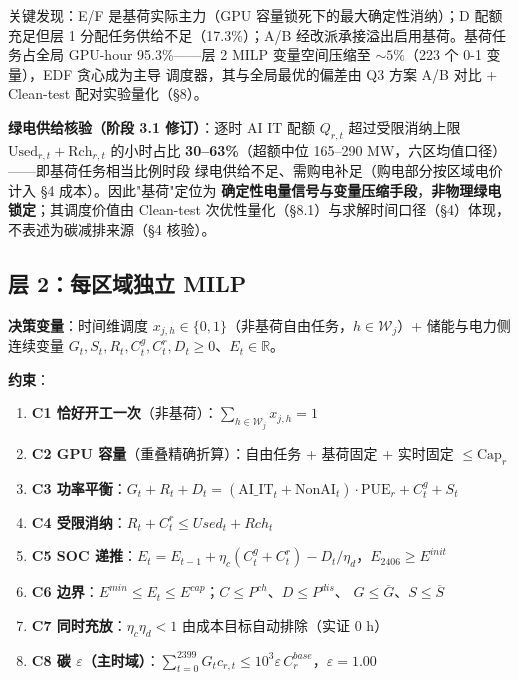\documentclass{internal-report}
\begin{document}
关键发现：E/F 是基荷实际主力（GPU 容量锁死下的最大确定性消纳）；D 配额充足但层 1
分配任务供给不足（17.3\%）；A/B 经改派承接溢出启用基荷。基荷任务占全局 GPU-hour
95.3\%——层 2 MILP 变量空间压缩至 $\sim 5\%$（223 个 0-1 变量），EDF 贪心成为主导
调度器，其与全局最优的偏差由 Q3 方案 A/B 对比 + Clean-test 配对实验量化（§8）。

\textbf{绿电供给核验（阶段 3.1 修订）}：逐时 AI IT 配额
$Q_{r,t}$ 超过受限消纳上限 $\text{Used}_{r,t}+\text{Rch}_{r,t}$ 的小时占比
\textbf{30--63\%}（超额中位 165--290 MW，六区均值口径）——即基荷任务相当比例时段
绿电供给不足、需购电补足（购电部分按区域电价计入 §4 成本）。因此"基荷"定位为
\textbf{确定性电量信号与变量压缩手段}，\textbf{非物理绿电锁定}；其调度价值由
Clean-test 次优性量化（§8.1）与求解时间口径（§4）体现，不表述为碳减排来源（§4 核验）。

\subsection{层 2：每区域独立 MILP}

\textbf{决策变量}：时间维调度 $x_{j,h}\in\{0,1\}$（非基荷自由任务，$h\in\mathcal{W}_j$）+
储能与电力侧连续变量 $G_t,S_t,R_t,C^g_t,C^r_t,D_t\ge0$、$E_t\in\mathbb{R}$。

\textbf{约束}：
\begin{enumerate}
  \item \textbf{C1 恰好开工一次}（非基荷）：$\sum_{h\in\mathcal{W}_j} x_{j,h}=1$
  \item \textbf{C2 GPU 容量}（重叠精确折算）：自由任务 + 基荷固定 + 实时固定 $\le \text{Cap}_r$
  \item \textbf{C3 功率平衡}：$G_t+R_t+D_t = (\text{AI\_IT}_t+\text{NonAI}_t)\cdot\text{PUE}_r + C^g_t + S_t$
  \item \textbf{C4 受限消纳}：$R_t + C^r_t \le Used_t + Rch_t$
  \item \textbf{C5 SOC 递推}：$E_t = E_{t-1} + \eta_c(C^g_t+C^r_t) - D_t/\eta_d$，$E_{2406}\ge E^{init}$
  \item \textbf{C6 边界}：$E^{min}\le E_t\le E^{cap}$；$C\le P^{ch}$、$D\le P^{dis}$、
        $G\le \overline{G}$、$S\le \overline{S}$
  \item \textbf{C7 同时充放}：$\eta_c\eta_d<1$ 由成本目标自动排除（实证 0 h）
  \item \textbf{C8 碳 $\varepsilon$（主时域）}：$\sum_{t=0}^{2399} G_t c_{r,t}
        \le 10^3\varepsilon\,C^{base}_r$，$\varepsilon=1.00$
\end{enumerate}
\end{document}
